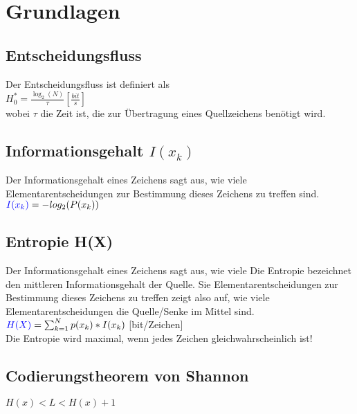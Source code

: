 
\section{Grundlagen}




\subsection{Entscheidungsfluss}
Der Entscheidungsfluss ist definiert als\\
\colorbox{lightlightgrey}{$H_{0}^{*}=\frac{\log _{2}(N)}{\tau}\left[\frac{b i t}{s}\right]$} \\
wobei $\tau$ die Zeit ist, die zur Übertragung eines Quellzeichens benötigt wird.


\subsection{Informationsgehalt $I(x_k)$}
Der Informationsgehalt eines Zeichens sagt aus, wie viele Elementarentscheidungen zur Bestimmung dieses Zeichens zu treffen sind.
\colorbox{lightlightgrey}{$\textcolor{blue}{I(x_k)} = -log_2(P(x_k))$}


\subsection{Entropie H(X)}
Der Informationsgehalt eines Zeichens sagt aus, wie viele Die Entropie bezeichnet den mittleren Informationsgehalt der Quelle. Sie Elementarentscheidungen zur Bestimmung dieses Zeichens zu treffen zeigt also auf, wie viele Elementarentscheidungen die Quelle/Senke im Mittel sind.\\
\colorbox{lightlightgrey}{$\textcolor{blue}{H(X)} = \sum_{k = 1}^{N}p(x_k) * I(x_k)$} [bit/Zeichen]\\
Die Entropie wird maximal, wenn jedes Zeichen gleichwahrscheinlich ist!





















\subsection{Codierungstheorem von Shannon}
\colorbox{lightlightgrey}{$H(x)<L<H(x) + 1$}

